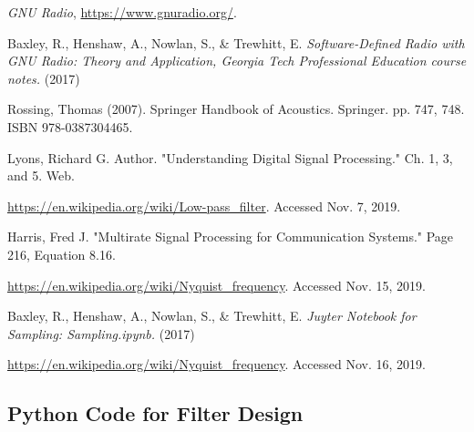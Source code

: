%
%
%
\begin{thebibliography}{1}

\emph{GNU Radio}, \url{https://www.gnuradio.org/}.

Baxley, R., Henshaw, A., Nowlan, S., \& Trewhitt, E. \emph{Software-Defined Radio with GNU Radio: Theory and Application, Georgia Tech Professional Education course notes.} (2017)

Rossing, Thomas (2007). Springer Handbook of Acoustics. Springer. pp. 747, 748. ISBN 978-0387304465.

Lyons, Richard G. Author. "Understanding Digital Signal Processing."  Ch. 1, 3, and 5. Web.

\url{https://en.wikipedia.org/wiki/Low-pass_filter}.  Accessed Nov. 7, 2019.

Harris, Fred J. "Multirate Signal Processing for Communication Systems." Page 216, Equation 8.16.

\url{https://en.wikipedia.org/wiki/Nyquist_frequency}.  Accessed Nov. 15, 2019.

Baxley, R., Henshaw, A., Nowlan, S., \& Trewhitt, E. \emph{Juyter Notebook for Sampling: Sampling.ipynb.} (2017)

\url{https://en.wikipedia.org/wiki/Nyquist_frequency}.  Accessed Nov. 16, 2019.

\end{thebibliography}


\newpage


\onecolumn
\appendix 

\subsection{Python Code for Filter Design\cite{notes:class}}

